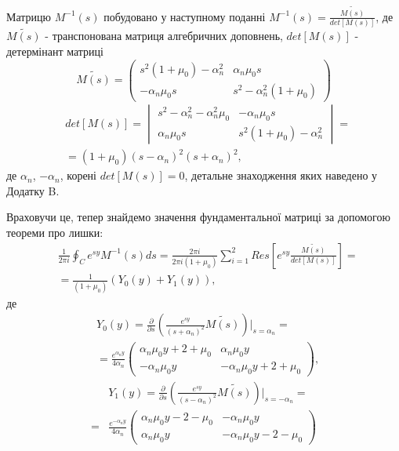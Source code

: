Матрицю $M^{-1}(s)$ побудовано у наступному поданні $M^{-1}(s) = \frac{\widetilde{M(s)}}{det[M(s)]}$, де $\widetilde{M(s)}$ - транспонована матриця алгебричних доповнень,
$det[M(s)]$ - детермінант матриці
\begin{equation}
    \widetilde{M(s)} = \begin{pmatrix}
        s^2 (1 + \mu_0) -\alpha_n^2 & \alpha_n \mu_0 s \\
        -\alpha_n \mu_0 s & s^2 -\alpha_n^2(1 + \mu_0)
     \end{pmatrix}
\end{equation}
\begin{align}
    &det[M(s)] = \begin{vmatrix}
        s^2 - \alpha_n^2 - \alpha_n^2\mu_0 & -\alpha_n \mu_0 s \\
        \alpha_n \mu_0 s & s^2 (1 + \mu_0) -\alpha_n^2
     \end{vmatrix} = \nonumber \\
    &=(1+\mu_0)(s - \alpha_n)^2(s + \alpha_n)^2,
\end{align}
де $\alpha_n$, $-\alpha_n$, корені $det[M(s)]=0$, детальне знаходження яких наведено у Додатку B.

Враховучи це, тепер знайдемо значення фундаментальної матриці за допомогою теореми про лишки:
\begin{align*}
    &\frac{1}{2\pi i} \oint_C e^{sy} M^{-1}(s)ds = \frac{2 \pi i}{2 \pi i (1 + \mu_0)} \sum_{i=1}^{2} Res\left[ e^{sy} \frac{\widetilde{M(s)}}{det[M(s)]} \right] = \\
    & = \frac{1}{(1 + \mu_0)} \left(Y_0(y) + Y_1(y) \right),
\end{align*}
де
\begin{align}\label{fund_mat_0_static_1}
    &Y_0(y) =  \frac{\partial}{\partial s} \left( \frac{e^{sy}}{(s+\alpha_n)^2} \widetilde{M(s)} \right) \Big|_{s=\alpha_n} = \nonumber \\
    &=\frac{e^{\alpha_n y}}{4\alpha_n} \begin{pmatrix}
    \alpha_n \mu_0 y + 2 + \mu_0 & \alpha_n \mu_0 y \\
    -\alpha_n \mu_0 y & -\alpha_n \mu_0 y + 2 + \mu_0
    \end{pmatrix},
\end{align}
\begin{align}\label{fund_mat_1_static_1}
    &Y_1(y) = \frac{\partial}{\partial s} \left(\frac{e^{sy}}{(s-\alpha_n)^2} \widetilde{M(s)} \right) \Big|_{s=-\alpha_n} = \nonumber \\
    =&\frac{e^{-\alpha_n y}}{4\alpha_n} \begin{pmatrix}
    \alpha_n \mu_0 y - 2 - \mu_0 & -\alpha_n \mu_0 y \\
    \alpha_n \mu_0 y & -\alpha_n \mu_0 y - 2 - \mu_0
    \end{pmatrix}
\end{align}

